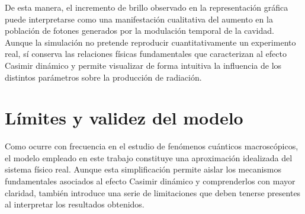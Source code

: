 \documentclass[11pt,a4paper]{article}
\begin{document}
De esta manera, el incremento de brillo observado en la representación gráfica puede interpretarse como una manifestación cualitativa del aumento en la población de fotones generados por la modulación temporal de la cavidad. Aunque la simulación no pretende reproducir cuantitativamente un experimento real, sí conserva las relaciones físicas fundamentales que caracterizan al efecto Casimir dinámico y permite visualizar de forma intuitiva la influencia de los distintos parámetros sobre la producción de radiación.

\section{Límites y validez del modelo}

Como ocurre con frecuencia en el estudio de fenómenos cuánticos macroscópicos, el modelo empleado en este trabajo constituye una aproximación idealizada del sistema físico real. Aunque esta simplificación permite aislar los mecanismos fundamentales asociados al efecto Casimir dinámico y comprenderlos con mayor claridad, también introduce una serie de limitaciones que deben tenerse presentes al interpretar los resultados obtenidos.
\end{document}
